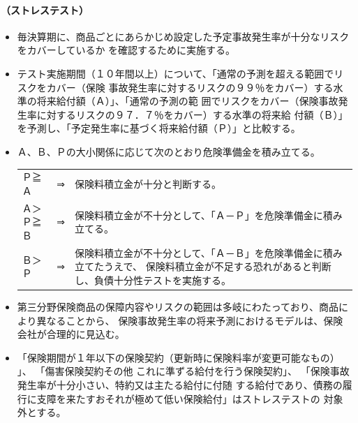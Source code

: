 \documentclass[report,gutter=10mm,fore-edge=10mm,uplatex,dvipdfmx]{jlreq}
\begin{document}
\paragraph{（ストレステスト）}
\begin{itemize}
 \item 毎決算期に、商品ごとにあらかじめ設定した予定事故発生率が十分なリスクをカバーしているか
を確認するために実施する。
 \item テスト実施期間（１０年間以上）について、「通常の予測を超える範囲でリスクをカバー（保険
事故発生率に対するリスクの９９％をカバー）する水準の将来給付額（Ａ）」、「通常の予測の範
囲でリスクをカバー（保険事故発生率に対するリスクの９７．７％をカバー）する水準の将来給
付額（Ｂ）」を予測し、「予定発生率に基づく将来給付額（Ｐ）」と比較する。
 \item Ａ、Ｂ、Ｐの大小関係に応じて次のとおり危険準備金を積み立てる。

\begin{tabularx}{\linewidth}[b]{lcX}
Ｐ≧Ａ&⇒&保険料積立金が十分と判断する。\\
Ａ＞Ｐ≧Ｂ &⇒&保険料積立金が不十分として、「Ａ－Ｐ」を危険準備金に積み立てる。\\
Ｂ＞Ｐ&⇒&保険料積立金が不十分として、「Ａ－Ｂ」を危険準備金に積み立てたうえで、
保険料積立金が不足する恐れがあると判断し、負債十分性テストを実施する。\\
\end{tabularx}

 \item 第三分野保険商品の保障内容やリスクの範囲は多岐にわたっており、商品により異なることから、
保険事故発生率の将来予測におけるモデルは、保険会社が合理的に見込む。
 \item 「保険期間が１年以下の保険契約（更新時に保険料率が変更可能なもの）
」、
「傷害保険契約その他
これに準ずる給付を行う保険契約」、
「保険事故発生率が十分小さい、特約又は主たる給付に付随
する給付であり、債務の履行に支障を来たすおそれが極めて低い保険給付」はストレステストの
対象外とする。
\end{itemize}
\end{document}
